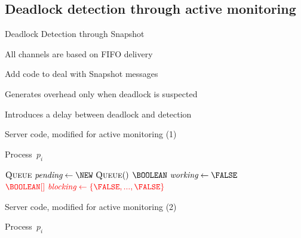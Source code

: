 \subsection{Deadlock detection through active monitoring}

\begin{frame}{Deadlock Detection through Snapshot}

\BI
\item All channels are based on FIFO delivery
\item Add code to deal with Snapshot messages
\EI

\bigskip
{}
\BI
\item Generates overhead only when deadlock is suspected
\item Introduces a delay between deadlock and detection
\EI


\end{frame}

\begin{frame}[shrink=16]{Server code, modified for active monitoring (1)}


\vspace{-12pt}
\begin{Procedure}
\caption{Process\ $p_i$}
  $\Queue\ \Pending \gets \NEW\ \Queue()$\;
  $\BOOLEAN\ \Working \gets \FALSE$\;
  $\color{red} \BOOLEAN[]\ \Blocking \gets \{ \FALSE, ..., \FALSE \}$\;
\end{Procedure}

\end{frame}

\begin{frame}[shrink=16]{Server code, modified for active monitoring (2)}

\vspace{-12pt}
\begin{Procedure}
\caption{Process\ $p_i$}
\end{Procedure}

\end{frame}

